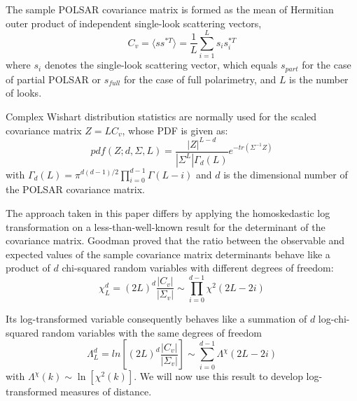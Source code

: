 \documentclass[journal]{IEEEtran}
\begin{document}
The sample POLSAR covariance matrix is formed as the mean of Hermitian outer product of independent single-look scattering vectors,
\begin{equation}
  C_v = \langle ss^{*T} \rangle = \frac{1}{L} \sum^L_{i=1}s_is_i^{*T}
\end{equation}
where $s_i$ denotes the single-look scattering vector,
  which equals $s_{part}$ for the case of partial POLSAR or
  $s_{full}$ for the case of full polarimetry,
and $L$ is the number of looks.

Complex Wishart distribution statistics are normally used for the scaled covariance matrix
$Z=LC_v$, whose PDF is given as:
\begin{equation}
  pdf(Z;d,\Sigma,L)=\frac{|Z|^{L-d}}{|\Sigma^L|\Gamma_d(L)}e^{-tr(\Sigma^{-1}Z)}
\end{equation}
with $\Gamma_d(L) = \pi^{d(d-1)/2} \prod^{d-1}_{i=0}\Gamma(L-i)$
and $d$ is the dimensional number of the POLSAR covariance matrix.

The approach taken in this paper differs by applying the homoskedastic log transformation  on a less-than-well-known result for the determinant of the covariance matrix.
Goodman \cite{Goodman_1963_AMS_178} proved
that the ratio between the observable and expected values of the sample covariance matrix determinants
  behave like a product of $d$ chi-squared random variables with different degrees of freedom: 
\begin{equation}
\chi^d_L = (2L)^d \frac{|C_v|}{|\Sigma_v|} \sim \prod_{i=0}^{d-1} \chi^2 (2L-2i)
\label{eqn:prod_chi_squared_rv}  
\end{equation}

Its log-transformed variable consequently 
  behaves like a summation of $d$ log-chi-squared random variables with the same degrees of freedom  
\begin{equation}
\Lambda^d_L = ln \left[ (2L)^d \frac{|C_v|}{|\Sigma_v|} \right] \sim \sum_{i=0}^{d-1} \Lambda^\chi (2L-2i)
\label{eqn:sum_log_chi_squared_rv}
\end{equation}
with
  $\Lambda^\chi (k) \sim \ln \left[ \chi^2 (k) \right]$.
We will now use this result to develop log-transformed measures of distance.
\end{document}

